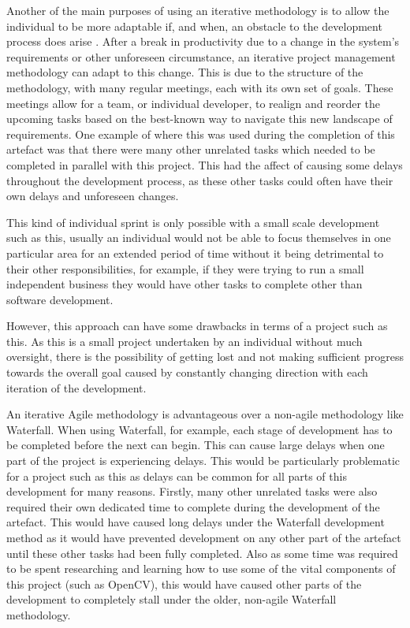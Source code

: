 \documentclass[11pt,a4paper]{report}
\begin{document}
Another of the main purposes of using an iterative methodology is to allow the individual to be more adaptable if, and when, an obstacle to the development process does arise \citep{Wiley_Project_Management}. After a break in productivity due to a change in the system's requirements or other unforeseen circumstance, an iterative project management methodology can adapt to this change. This is due to the structure of the methodology, with many regular meetings, each with its own set of goals. These meetings allow for a team, or individual developer, to realign and reorder the upcoming tasks based on the best-known way to navigate this new landscape of requirements. One example of where this was used during the completion of this artefact was that there were many other unrelated tasks which needed to be completed in parallel with this project. This had the affect of causing some delays throughout the development process, as these other tasks could often have their own delays and unforeseen changes. 

This kind of individual sprint is only possible with a small scale development such as this, usually an individual would not be able to focus themselves in one particular area for an extended period of time without it being detrimental to their other responsibilities, for example, if they were trying to run a small independent business they would have other tasks to complete other than software development. 

However, this approach can have some drawbacks in terms of a project such as this. As this is a small project undertaken by an individual without much oversight, there is the possibility of getting lost and not making sufficient progress towards the overall goal caused by constantly changing direction with each iteration of the development.

An iterative Agile methodology is advantageous over a non-agile methodology like Waterfall. When using Waterfall, for example, each stage of development has to be completed before the next can begin. This can cause large delays when one part of the project is experiencing delays. This would be particularly problematic for a project such as this as delays can be common for all parts of this development for many reasons. Firstly, many other unrelated tasks were also required their own dedicated time to complete during the development of the artefact. This would have caused long delays under the Waterfall development method as it would have prevented development on any other part of the artefact until these other tasks had been fully completed. Also as some time was required to be spent researching and learning how to use some of the vital components of this project (such as OpenCV), this would have caused other parts of the development to completely stall under the older, non-agile Waterfall methodology. 
\end{document}
